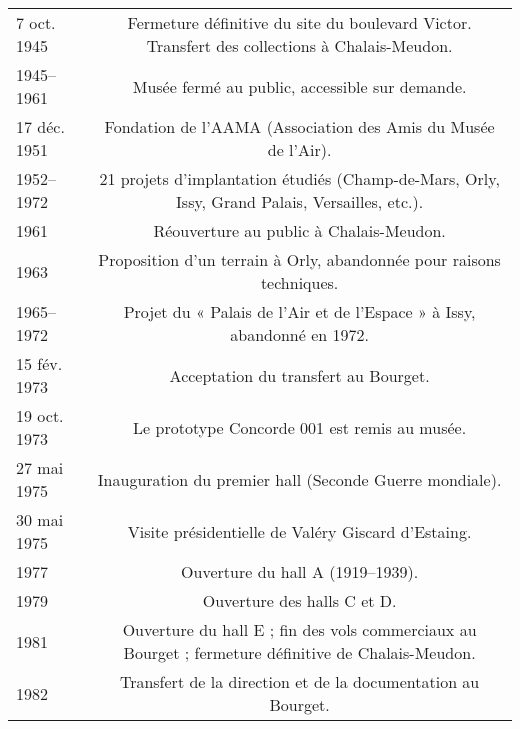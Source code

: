 \begin{longtable}{B C}
	 7 oct. 1945 & Fermeture définitive du site du boulevard Victor. Transfert des collections à Chalais-Meudon. \\
	 1945--1961 & Musée fermé au public, accessible sur demande. \\
	 17 déc. 1951 & Fondation de l'AAMA (Association des Amis du Musée de l'Air). \\
	 1952--1972 & 21 projets d'implantation étudiés (Champ-de-Mars, Orly, Issy, Grand Palais, Versailles, etc.). \\
	 1961 & Réouverture au public à Chalais-Meudon. \\
	 1963 & Proposition d'un terrain à Orly, abandonnée pour raisons techniques. \\
	 1965--1972 & Projet du « Palais de l'Air et de l'Espace » à Issy, abandonné en 1972. \\
	
	15 fév. 1973 & Acceptation du transfert au Bourget. \\
	19 oct. 1973 & Le prototype Concorde 001 est remis au musée. \\
	27 mai 1975 & Inauguration du premier hall (Seconde Guerre mondiale). \\
	30 mai 1975 & Visite présidentielle de Valéry Giscard d'Estaing. \\
	1977 & Ouverture du hall A (1919--1939). \\
	1979 & Ouverture des halls C et D. \\
	1981 & Ouverture du hall E ; fin des vols commerciaux au Bourget ; fermeture définitive de Chalais-Meudon. \\
	1982 & Transfert de la direction et de la documentation au Bourget. \\
	

\end{longtable}
